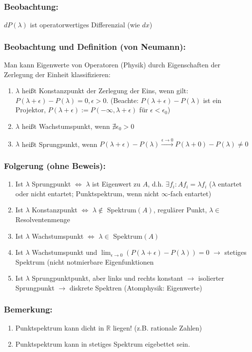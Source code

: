 \documentclass[twoside,a4paper]{scrartcl}
\newcommand{\R}{\mathbb{R}}
\renewcommand{\1}{\mathds{1}}
\newcommand{\ra}{\rightarrow}
\renewcommand{\l}{\lambda}
\newcommand{\lra}{\Leftrightarrow}
\renewcommand{\R}{\mathbb{R}}
\begin{document}
\subsubsection*{Beobachtung:}
$dP(\lambda)$ ist operatorwertiges Differenzial (wie $dx$)
\subsubsection*{Beobachtung und Definition (von Neumann):}
Man kann Eigenwerte von Operatoren (Physik) durch Eigenschaften der Zerlegung der Einheit klassifizieren:
\begin{enumerate}
\item $\lambda$ heißt Konstanzpunkt der Zerlegung der Eins, wenn gilt: $P(\lambda+\epsilon)-P(\lambda)=0, \epsilon>0$. (Beachte: $P(\lambda+\epsilon)-P(\lambda)$ ist ein Projektor, $P(\lambda+\epsilon):=P(-\infty,\lambda+\epsilon)$ für $\epsilon< \epsilon_0$)
\item $\lambda$ heißt Wachstumspunkt, wenn $\nexists \epsilon_0>0$
\item $\lambda$ heißt Sprungpunkt, wenn $P(\lambda+\epsilon)-P(\lambda) \stackrel{\epsilon \ra 0}{\ra} P(\lambda+0)-P(\lambda)\neq 0$
\end{enumerate}
\subsubsection*{Folgerung (ohne Beweis):}
\begin{enumerate}
\item Ist $\lambda$ Sprungpunkt $\lra $ $\lambda$ ist Eigenwert zu $A$, d.h. $\exists f_i: Af_i=\l f_i$ ($\l$ entartet oder nicht entartet; Punktspektrum, wenn nicht $\infty$-fach entartet)
\item Ist $\lambda$ Konstanzpunkt $\lra$  $\lambda \notin$ Spektrum$(A)$, regulärer Punkt, $\l \in$ Resolventenmenge
\item Ist $\l$ Wachstumspunkt $\lra$ $\l \in$ Spektrum$(A)$
\item Ist $\l$ Wachstumspunkt und $\lim_{\epsilon \ra 0}(P(\l+\epsilon)-P(\l))=0$ $\ra$ stetiges Spektrum (nicht notmierbare Eigenfunktionen 
\item Ist $\l$ Sprungpunktpunkt, aber links und rechts konstant $\ra$ isolierter Sprungpunkt $\ra$ diskrete Spektren (Atomphysik: Eigenwerte)
\end{enumerate}

\subsubsection*{Bemerkung:}
\begin{enumerate}
\item Punktspektrum kann dicht in $\R$ liegen! (z.B. rationale Zahlen)
\item Punktspektrum kann in stetiges Spektrum eigebettet sein.
\end{enumerate}
\end{document}
